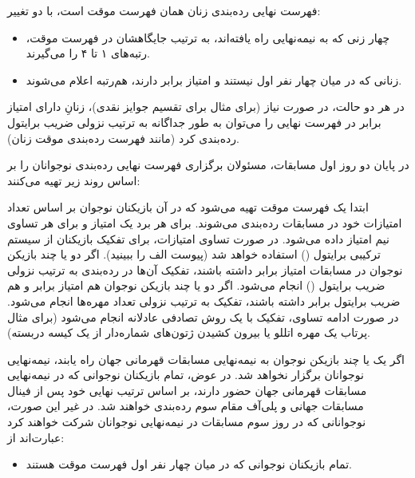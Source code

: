 فهرست نهایی رده‌بندی زنان همان فهرست موقت است، با دو تغییر:

\begin{itemize}
  \item چهار زنی که به نیمه‌نهایی راه یافته‌اند، به ترتیب جایگاهشان در فهرست موقت، رتبه‌های ۱ تا ۴ را می‌گیرند.
  \item زنانی که در میان چهار نفر اول نیستند و امتیاز برابر دارند، هم‌رتبه اعلام می‌شوند.
\end{itemize}

در هر دو حالت، در صورت نیاز (برای مثال برای تقسیم جوایز نقدی)، زنانِ دارای امتیاز برابر در فهرست نهایی را می‌توان به طور جداگانه به ترتیب نزولی ضریب برایتول رده‌بندی کرد (مانند فهرست رده‌بندی موقت زنان).


در پایان دو روز اول مسابقات، مسئولان برگزاری فهرست نهایی رده‌بندی نوجوانان را بر اساس روند زیر تهیه می‌کنند:


ابتدا یک فهرست موقت تهیه می‌شود که در آن بازیکنان نوجوان بر اساس تعداد امتیازات خود در مسابقات رده‌بندی می‌شوند. برای هر برد یک امتیاز و برای هر تساوی نیم امتیاز داده می‌شود. در صورت تساوی امتیازات، برای تفکیک بازیکنان از سیستم ترکیبی برایتول () استفاده خواهد شد (پیوست الف را ببینید). اگر دو یا چند بازیکن نوجوان در مسابقات امتیاز برابر داشته باشند، تفکیک آن‌ها در رده‌بندی به ترتیب نزولی ضریب برایتول () انجام می‌شود. اگر دو یا چند بازیکن نوجوان هم امتیاز برابر و هم ضریب برایتول برابر داشته باشند، تفکیک به ترتیب نزولی تعداد مهره‌ها انجام می‌شود. در صورت ادامه تساوی، تفکیک با یک روش تصادفی عادلانه انجام می‌شود (برای مثال پرتاب یک مهره اتللو یا بیرون کشیدن ژتون‌های شماره‌دار از یک کیسه دربسته).


اگر یک یا چند بازیکن نوجوان به نیمه‌نهایی مسابقات قهرمانی جهان راه یابند، نیمه‌نهایی نوجوانان برگزار نخواهد شد. در عوض، تمام بازیکنان نوجوانی که در نیمه‌نهایی مسابقات قهرمانی جهان حضور دارند، بر اساس ترتیب نهایی خود پس از فینال مسابقات جهانی و پلی‌آف مقام سوم رده‌بندی خواهند شد. در غیر این صورت، نوجوانانی که در روز سوم مسابقات در نیمه‌نهایی نوجوانان شرکت خواهند کرد عبارت‌اند از:

\begin{itemize}
  \item تمام بازیکنان نوجوانی که در میان چهار نفر اول فهرست موقت هستند.
\end{itemize}

